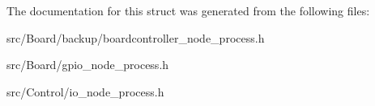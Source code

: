 The documentation for this struct was generated from the following files\+:\begin{DoxyCompactItemize}
\item 
src/\+Board/backup/boardcontroller\+\_\+node\+\_\+process.\+h\item 
src/\+Board/gpio\+\_\+node\+\_\+process.\+h\item 
src/\+Control/io\+\_\+node\+\_\+process.\+h\end{DoxyCompactItemize}
